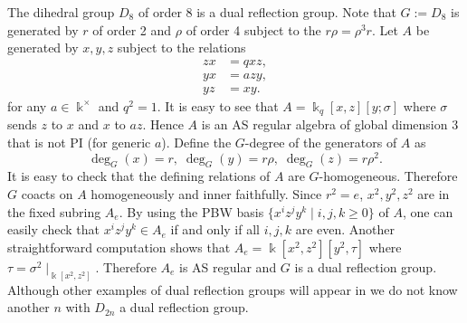 \begin{example}
\label{xxex3.7} The dihedral group $D_{8}$ of order 8 is 
a dual reflection group. Note that $G:=D_{8}$ is generated by
$r$ of order 2 and $\rho$ of order 4 subject to the 
$r\rho=\rho^3 r$. Let $A$ be generated by 
$x,y,z$ subject to the relations
$$\begin{aligned}
zx& = q xz,\\
yx& = a zy,\\
yz& = xy.
\end{aligned}
$$
for any $a\in \Bbbk^{\times}$ and $q^2=1$. It is easy to see
that $A=\Bbbk_{q}[x,z][y; \sigma]$ where $\sigma$ sends $z$ to $x$
and $x$ to $az$. Hence $A$ is an AS regular algebra of global dimension 
3 that is not PI (for generic $a$). Define the
$G$-degree of the generators of $A$ as
$$\deg_G(x)=r, \; \deg_G(y)= r\rho, \; \deg_G(z)=
r\rho^2.$$
It is easy to check that the defining relations of
$A$ are $G$-homogeneous. Therefore $G$ coacts on 
$A$ homogeneously and inner faithfully. 
Since $r^2=e$, $x^2, y^2, z^2$ are in 
the fixed subring $A_e$. By using the 
PBW basis $\{x^i z^j y^k\mid i,j,k\geq 0\}$
of $A$, one can easily check that 
$x^i z^j y^k\in A_e$ if and only if all $i,j,k$
are even. Another straightforward computation
shows that $A_e=\Bbbk[x^2,z^2][y^2, \tau]$
where $\tau=\sigma^2\mid_{\Bbbk[x^2,z^2]}$. Therefore
$A_e$ is AS regular and $G$ is a dual reflection group.  Although other examples of dual reflection groups will appear in \cite{KKZ5} we do not know another $n$ with $D_{2n}$ a dual reflection group.
\end{example}

